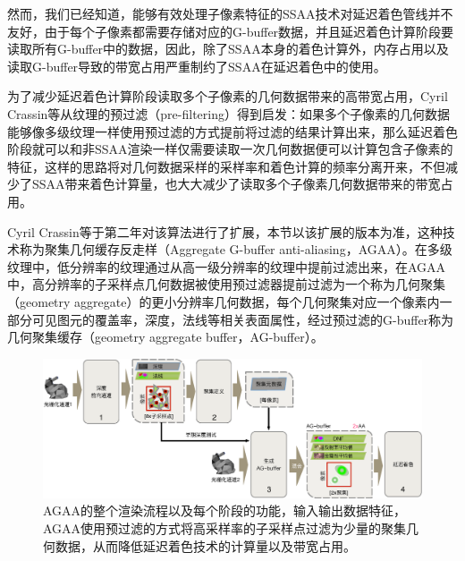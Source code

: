 然而，我们已经知道，能够有效处理子像素特征的SSAA技术对延迟着色管线并不友好，由于每个子像素都需要存储对应的G-buffer数据，并且延迟着色计算阶段要读取所有G-buffer中的数据，因此，除了SSAA本身的着色计算外，内存占用以及读取G-buffer导致的带宽占用严重制约了SSAA在延迟着色中的使用。

为了减少延迟着色计算阶段读取多个子像素的几何数据带来的高带宽占用，Cyril Crassin\cite{a:AggregateG-BufferAnti-Aliasing}等从纹理的预过滤（pre-filtering）得到启发：如果多个子像素的几何数据能够像多级纹理一样使用预过滤的方式提前将过滤的结果计算出来，那么延迟着色阶段就可以和非SSAA渲染一样仅需要读取一次几何数据便可以计算包含子像素的特征，这样的思路将对几何数据采样的采样率和着色计算的频率分离开来，不但减少了SSAA带来着色计算量，也大大减少了读取多个子像素几何数据带来的带宽占用。

Cyril Crassin等于第二年\cite{a:AggregateG-BufferAnti-Aliasing-ExtendedVersion-}对该算法进行了扩展，本节以该扩展的版本为准，这种技术称为聚集几何缓存反走样（Aggregate G-buffer anti-aliasing，AGAA）。在多级纹理中，低分辨率的纹理通过从高一级分辨率的纹理中提前过滤出来，在AGAA中，高分辨率的子采样点几何数据被使用预过滤器提前过滤为一个称为几何聚集（geometry aggregate）的更小分辨率几何数据，每个几何聚集对应一个像素内一部分可见图元的覆盖率，深度，法线等相关表面属性，经过预过滤的G-buffer称为几何聚集缓存（geometry aggregate buffer，AG-buffer）。

\begin{figure}
\begin{fullwidth}
	\includegraphics[width=1.\thewidth]{figures/shade/agaa}		
	\caption{AGAA的整个渲染流程以及每个阶段的功能，输入输出数据特征，AGAA使用预过滤的方式将高采样率的子采样点过滤为少量的聚集几何数据，从而降低延迟着色技术的计算量以及带宽占用。}
	\label{f:shade-agaa}
\end{fullwidth}
\end{figure}

